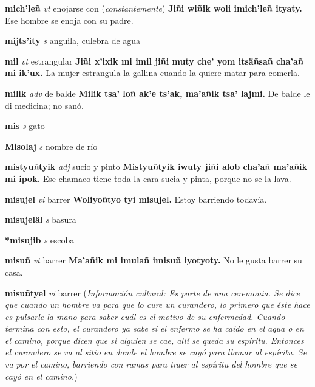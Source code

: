 \documentclass[10pt]{scrbook}
\newcommand{\entry}[1]{\textbf{#1}}
\newcommand{\partofspeech}[1]{\textit{#1}}
\newcommand{\spanishtranslation}[1]{#1}
\newcommand{\clarification}[1]{(\textit{#1})}
\newcommand{\cholexample}[1]{\textbf{#1}}
\newcommand{\exampletranslation}[1]{#1}
\newcommand{\culturalinformation}[1]{(\textit{#1})}
\begin{document}
\begin{multicols}{2}
\entry{mich'leñ}
\partofspeech{vt}
\spanishtranslation{enojarse con}
\clarification{constantemente}
\cholexample{Jiñi wiñik woli imich'leñ ityaty.}
\exampletranslation{Ese hombre se enoja con su padre.}

\entry{mijts'ity}
\partofspeech{s}
\spanishtranslation{anguila, culebra de agua}

\entry{mil}
\partofspeech{vt}
\spanishtranslation{estrangular}
\cholexample{Jiñi x'ixik mi imil jiñi muty che' yom itsäñsañ cha'añ mi ik'ux.}
\exampletranslation{La mujer estrangula la gallina cuando la quiere matar para comerla.}

\entry{milik}
\partofspeech{adv}
\spanishtranslation{de balde}
\cholexample{Milik tsa' loñ ak'e ts'ak, ma'añik tsa' lajmi.}
\exampletranslation{De balde le di medicina; no sanó.}

\entry{mis}
\partofspeech{s}
\spanishtranslation{gato}

\entry{Misolaj}
\partofspeech{s}
\spanishtranslation{nombre de río}

\entry{mistyuñtyik}
\partofspeech{adj}
\spanishtranslation{sucio y pinto}
\cholexample{Mistyuñtyik iwuty jiñi alob cha'añ ma'añik mi ipok.}
\exampletranslation{Ese chamaco tiene toda la cara sucia y pinta, porque no se la lava.}

\entry{misujel}
\partofspeech{vi}
\spanishtranslation{barrer}
\cholexample{Woliyoñtyo tyi misujel.}
\exampletranslation{Estoy barriendo todavía.}

\entry{misujeläl}
\partofspeech{s}
\spanishtranslation{basura}

\entry{*misujib}
\partofspeech{s}
\spanishtranslation{escoba}

\entry{misuñ}
\partofspeech{vt}
\spanishtranslation{barrer}
\cholexample{Ma'añik mi imulañ imisuñ iyotyoty.}
\exampletranslation{No le gusta barrer su casa.}

\entry{misuñtyel}
\partofspeech{vi}
\spanishtranslation{barrer}
\culturalinformation{Información cultural: Es parte de una ceremonia. Se dice que cuando un hombre va para que lo cure un curandero, lo primero que éste hace es pulsarle la mano para saber cuál es el motivo de su enfermedad. Cuando termina con esto, el curandero ya sabe si el enfermo se ha caído en el agua o en el camino, porque dicen que si alguien se cae, allí se queda su espíritu. Entonces el curandero se va al sitio en donde el hombre se cayó para llamar al espíritu. Se va por el camino, barriendo con ramas para traer al espíritu del hombre que se cayó en el camino.}


\end{multicols}
\end{document}
